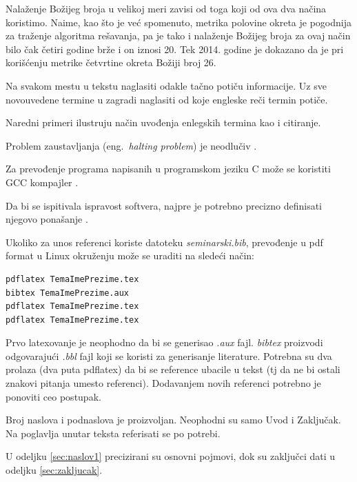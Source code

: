 \documentclass[a4paper]{article}
\begin{document}
Nalaženje Božijeg broja u velikoj meri zavisi od toga koji od ova dva načina koristimo. Naime, kao što je već spomenuto, metrika polovine okreta je pogodnija za traženje algoritma rešavanja, pa je tako i nalaženje Božijeg broja za ovaj način bilo čak četiri godine brže i on iznosi 20. Tek 2014. godine je dokazano da je pri korišćenju metrike četvrtine okreta Božiji broj 26.

Na svakom mestu u tekstu naglasiti odakle tačno potiču informacije. Uz sve novouvedene termine u zagradi naglasiti od koje engleske reči termin potiče. 

Naredni primeri ilustruju način uvođenja enlegskih termina kao i citiranje.

\begin{primer}
Problem zaustavljanja (eng.~{\em halting problem}) je neodlučiv \cite{haltingproblem}.
\end{primer}

\begin{primer}
Za prevođenje programa napisanih u programskom jeziku C može se koristiti GCC kompajler \cite{gcc}.
\end{primer}

\begin{primer}
 Da bi se ispitivala ispravost softvera, najpre je potrebno precizno definisati njegovo ponašanje \cite{laski2009software}. 
\end{primer}

Ukoliko za unos referenci koriste datoteku {\em seminarski.bib},  prevođenje u pdf format u Linux okruženju može se uraditi na sledeći način:
\begin{verbatim}
pdflatex TemaImePrezime.tex 
bibtex TemaImePrezime.aux 
pdflatex TemaImePrezime.tex 
pdflatex TemaImePrezime.tex 
\end{verbatim}
Prvo latexovanje je neophodno da bi se generisao {\em .aux} fajl. {\em bibtex} proizvodi odgovarajući {\em .bbl} fajl koji se koristi za generisanje literature. 
Potrebna su dva prolaza (dva puta pdflatex) da bi se reference ubacile u tekst (tj da ne bi ostali znakovi pitanja umesto referenci). Dodavanjem novih referenci potrebno je ponoviti ceo postupak.  


Broj naslova i podnaslova je proizvoljan. Neophodni su samo Uvod i Zaključak. Na poglavlja unutar teksta referisati se po potrebi. 
\begin{primer}
U odeljku \ref{sec:naslov1} precizirani su osnovni pojmovi, dok su zaključci dati u odeljku \ref{sec:zakljucak}.
\end{primer}
\end{document}
